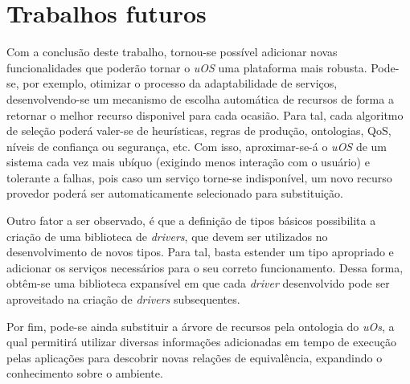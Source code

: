 \section{Trabalhos futuros}
\label{sec:trabalhosFuturos}

Com a conclusão deste trabalho, tornou-se possível adicionar novas funcionalidades que poderão tornar o \emph{uOS} uma plataforma mais robusta. Pode-se, por exemplo, otimizar o processo da adaptabilidade de serviços, desenvolvendo-se um mecanismo de escolha automática de recursos de forma a retornar o melhor recurso disponivel para cada ocasião. Para tal, cada algoritmo de seleção poderá valer-se de heurísticas, regras de produção, ontologias, QoS, níveis de confiança ou segurança, etc. Com isso, aproximar-se-á o \emph{uOS} de um sistema cada vez mais ubíquo (exigindo menos interação com o usuário) e tolerante a falhas, pois caso um serviço torne-se indisponível, um novo recurso provedor poderá ser automaticamente selecionado para substituição.

Outro fator a ser observado, é que a definição de tipos básicos possibilita a criação de uma biblioteca de \emph{drivers}, que devem ser utilizados no desenvolvimento de novos tipos. Para tal, basta estender um tipo apropriado e adicionar os serviços necessários para o seu correto funcionamento. Dessa forma, obtêm-se uma biblioteca expansível em que cada \emph{driver} desenvolvido pode ser aproveitado na criação de \emph{drivers} subsequentes.

Por fim, pode-se ainda substituir a árvore de recursos pela ontologia do \emph{uOs}, a qual permitirá utilizar diversas informações adicionadas em tempo de execução pelas aplicações para descobrir novas relações de  equivalência, expandindo o conhecimento sobre o ambiente.